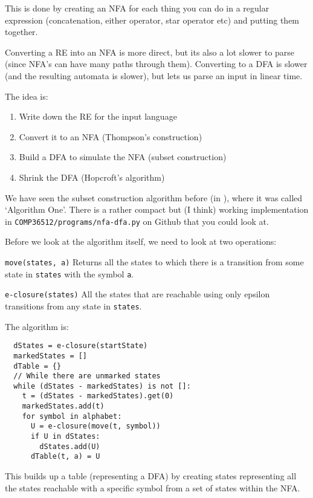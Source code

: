 This is done by creating an NFA for each thing you can do in a regular
expression (concatenation, either operator, star operator etc) and putting them
together.


Converting a RE into an NFA is more direct, but its also a lot slower to parse
(since NFA's can have many paths through them). Converting to a DFA is slower
(and the resulting automata is slower), but lets us parse an input in linear
time.

The idea is:


\begin{enumerate}
  \item Write down the RE for the input language
  \item Convert it to an NFA (Thompson's construction)
  \item Build a DFA to simulate the NFA (subset construction)
  \item Shrink the DFA (Hopcroft's algorithm)
\end{enumerate}



We have seen the subset construction algorithm before (in ),
where it was called `Algorithm One'. There is a rather compact but (I think)
working implementation in \texttt{COMP36512/programs/nfa-dfa.py} on Github that
you could look at.

Before we look at the algorithm itself, we need to look at two operations:

\begin{description}
  \item \texttt{move(states, a)} Returns all the states to which there is a
  transition from some state in \texttt{states} with the symbol \texttt{a}.
  \item \texttt{e-closure(states)} All the states that are reachable using only
  epsilon transitions from any state in \texttt{states}.
\end{description}

The algorithm is:

\begin{lstlisting}
  dStates = e-closure(startState)
  markedStates = []
  dTable = {}
  // While there are unmarked states
  while (dStates - markedStates) is not []:
    t = (dStates - markedStates).get(0)
    markedStates.add(t)
    for symbol in alphabet:
      U = e-closure(move(t, symbol))
      if U in dStates:
        dStates.add(U)
      dTable(t, a) = U
\end{lstlisting}

This builds up a table (representing a DFA) by creating states representing all
the states reachable with a specific symbol from a set of states within the NFA.

